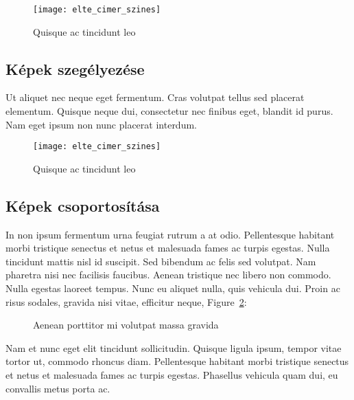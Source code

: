 \begin{figure}[H]
	\centering
	\texttt{[image: elte\_cimer\_szines]}
	\caption{Quisque ac tincidunt leo}
	\label{fig:example-1}
\end{figure}

\subsection{Képek szegélyezése}

Ut aliquet nec neque eget fermentum. Cras volutpat tellus sed placerat elementum. Quisque neque dui, consectetur nec finibus eget, blandit id purus. Nam eget ipsum non nunc placerat interdum.

\begin{figure}[H]
	\centering
	\texttt{[image: elte\_cimer\_szines]}
	\caption{Quisque ac tincidunt leo}
\end{figure}

\subsection{Képek csoportosítása}

In non ipsum fermentum urna feugiat rutrum a at odio. Pellentesque habitant morbi tristique senectus et netus et malesuada fames ac turpis egestas. Nulla tincidunt mattis nisl id suscipit. Sed bibendum ac felis sed volutpat. Nam pharetra nisi nec facilisis faucibus. Aenean tristique nec libero non commodo. Nulla egestas laoreet tempus. Nunc eu aliquet nulla, quis vehicula dui. Proin ac risus sodales, gravida nisi vitae, efficitur neque, Figure~\ref{fig:example-2}:

\begin{figure}[H]
	\centering
	\hspace{5pt}
	\caption{Aenean porttitor mi volutpat massa gravida}
	\label{fig:example-2}
\end{figure}

Nam et nunc eget elit tincidunt sollicitudin. Quisque ligula ipsum, tempor vitae tortor ut, commodo rhoncus diam. Pellentesque habitant morbi tristique senectus et netus et malesuada fames ac turpis egestas. Phasellus vehicula quam dui, eu convallis metus porta ac.


